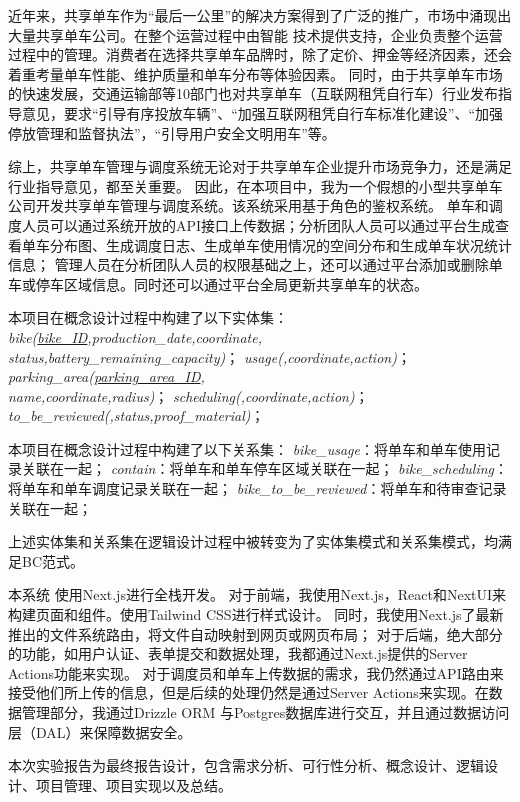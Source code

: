 \noindent{}
{\fangsong
近年来，共享单车作为“最后一公里”的解决方案得到了广泛的推广，市场中涌现出大量共享单车公司。在整个运营过程中由智能
技术提供支持，企业负责整个运营过程中的管理。消费者在选择共享单车品牌时，除了定价、押金等经济因素，还会着重考量单车性能、维护质量和单车分布等体验因素。
同时，由于共享单车市场的快速发展，交通运输部等10部门也对共享单车（互联网租凭自行车）行业发布指导意见，要求“引导有序投放车辆”、“加强互联网租凭自行车标准化建设”、“加强停放管理和监督执法”，“引导用户安全文明用车”等。

综上，共享单车管理与调度系统无论对于共享单车企业提升市场竞争力，还是满足行业指导意见，都至关重要。
因此，在本项目中，我为一个假想的小型共享单车公司开发共享单车管理与调度系统。该系统采用基于角色的鉴权系统。
单车和调度人员可以通过系统开放的API接口上传数据；分析团队人员可以通过平台生成查看单车分布图、生成调度日志、生成单车使用情况的空间分布和生成单车状况统计信息；
管理人员在分析团队人员的权限基础之上，还可以通过平台添加或删除单车或停车区域信息。同时还可以通过平台全局更新共享单车的状态。




本项目在概念设计过程中构建了以下实体集：
   \textit{bike(\underline{bike\_ID},production\_date,coordinate,\\status,battery\_remaining\_capacity)}；
   \textit{usage(,coordinate,action)}；
   \textit{parking\_area(\underline{parking\_area\_ID},\\name,coordinate,radius)}；
   \textit{scheduling(,coordinate,action)}；
   \textit{to\_be\_reviewed(,status,proof\_material)}；


本项目在概念设计过程中构建了以下关系集：
   \textit{bike\_usage}：将单车和单车使用记录关联在一起；
   \textit{contain}：将单车和单车停车区域关联在一起；
   \textit{bike\_scheduling}：将单车和单车调度记录关联在一起；
   \textit{bike\_to\_be\_reviewed}：将单车和待审查记录关联在一起；

上述实体集和关系集在逻辑设计过程中被转变为了实体集模式和关系集模式，均满足BC范式。

本系统
使用Next.js进行全栈开发。
对于前端，我使用Next.js，React和NextUI来构建页面和组件。使用Tailwind CSS进行样式设计。
同时，我使用Next.js了最新推出的文件系统路由，将文件自动映射到网页或网页布局；
对于后端，绝大部分的功能，如用户认证、表单提交和数据处理，我都通过Next.js提供的Server Actions功能来实现。
对于调度员和单车上传数据的需求，我仍然通过API路由来
接受他们所上传的信息，但是后续的处理仍然是通过Server Actions来实现。在数据管理部分，我通过Drizzle ORM
与Postgres数据库进行交互，并且通过数据访问层（DAL）来保障数据安全。

本次实验报告为最终报告设计，包含需求分析、可行性分析、概念设计、逻辑设计、项目管理、项目实现以及总结。
}

\noindent{}